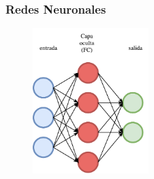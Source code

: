 \documentclass{beamer}
\begin{document}
\begin{frame}[plain]
\frametitle{Redes Neuronales}
\begin{figure}
    \centering
    \includegraphics[width=0.4\textwidth]{images/neural-net.pdf}
\end{figure}
\end{frame}
\end{document}
